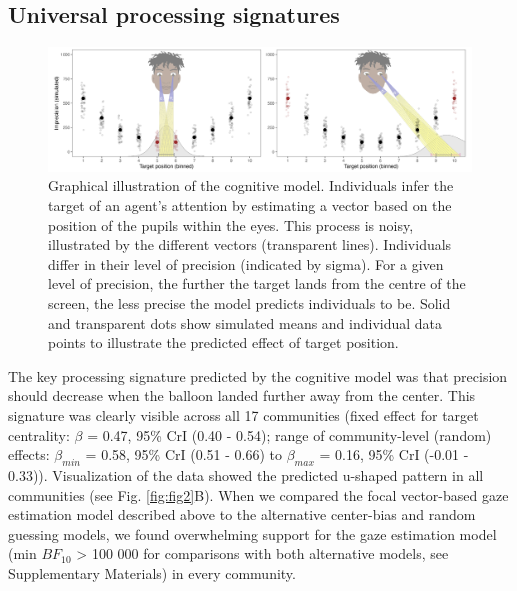 \documentclass[
  man,floatsintext]{apa6}
\begin{document}
\hypertarget{universal-processing-signatures}{%
\subsection{Universal processing signatures}\label{universal-processing-signatures}}

\begin{figure}

{\centering \includegraphics[width=1\linewidth]{../figures/fig1_3} 

}

\caption{Graphical illustration of the cognitive model. Individuals infer the target of an agent’s attention by estimating a vector based on the position of the pupils within the eyes. This process is noisy, illustrated by the different vectors (transparent lines). Individuals differ in their level of precision (indicated by sigma). For a given level of precision, the further the target lands from the centre of the screen, the less precise the model predicts individuals to be. Solid and transparent dots show simulated means and individual data points to illustrate the predicted effect of target position.}\label{fig:fig12}
\end{figure}

The key processing signature predicted by the cognitive model was that precision should decrease when the balloon landed further away from the center. This signature was clearly visible across all 17 communities (fixed effect for target centrality: \(\beta\) = 0.47, 95\% CrI (0.40 - 0.54); range of community-level (random) effects: \(\beta_{min}\) = 0.58, 95\% CrI (0.51 - 0.66) to \(\beta_{max}\) = 0.16, 95\% CrI (-0.01 - 0.33)). Visualization of the data showed the predicted u-shaped pattern in all communities (see Fig. \ref{fig:fig2}B). When we compared the focal vector-based gaze estimation model described above to the alternative center-bias and random guessing models, we found overwhelming support for the gaze estimation model (min \(BF_{10}\) \textgreater{} 100 000 for comparisons with both alternative models, see Supplementary Materials) in every community.
\end{document}
